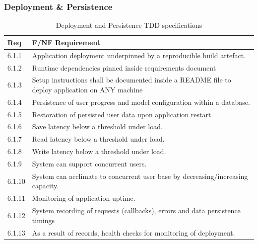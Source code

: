 \documentclass{article}
\begin{document}
\subsubsection{Deployment \& Persistence}
\begin{table}[H]
\centering
\begin{tabular}{|p{1cm}|p{12cm}|}
\hline
\textbf{Req} & \textbf{F/NF Requirement} \\
\hline
6.1.1 & Application deployment underpinned by a reproducible build artefact. \\
\hline
6.1.2 & Runtime dependencies pinned inside requirements document\\
\hline
6.1.3 & Setup instructions shall be documented inside a README file to deploy application on ANY machine\\
\hline
6.1.4 & Persistence of user progress and model configuration within a database. \\
\hline
6.1.5 & Restoration of persisted user data upon application restart \\
\hline
6.1.6 & Save latency below a threshold under load. \\
\hline
6.1.7 & Read latency below a threshold under load. \\
\hline
6.1.8 & Write latency below a threshold under load. \\
\hline
6.1.9 & System can support concurrent users. \\
\hline
6.1.10 & System can acclimate to concurrent user base by decreasing/increasing capacity. \\
\hline
6.1.11 & Monitoring of application uptime. \\ %
\hline
6.1.12 & System recording of requests (callbacks), errors and data persistence timings \\
\hline
6.1.13 & As a result of records, health checks for monitoring of deployment. \\
\hline
\end{tabular}
\caption{Deployment and Persistence TDD specifications}
\end{table}
\end{document}
